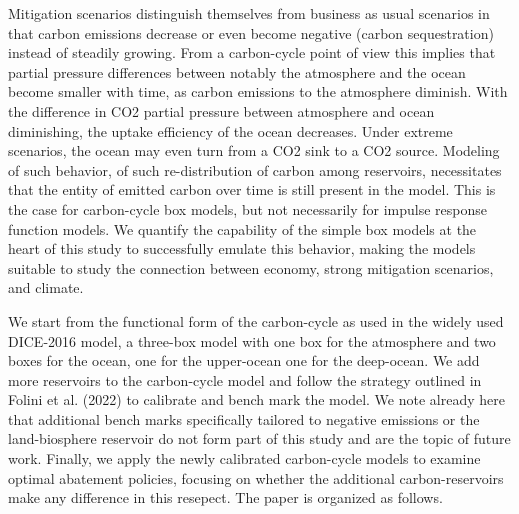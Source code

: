 \documentclass[11pt, a4paper, pdftex, twoside, dvipsnames]{article}
\begin{document}
Mitigation scenarios distinguish themselves from business as usual scenarios in that carbon emissions decrease or even become negative (carbon sequestration) instead of steadily growing. From a carbon-cycle point of view this implies that partial pressure differences between notably the atmosphere and the ocean become smaller with time, as carbon emissions to the atmosphere diminish. With the difference in CO2 partial pressure between atmosphere and ocean diminishing, the uptake efficiency of the ocean decreases. Under extreme scenarios, the ocean may even turn from a CO2 sink to a CO2 source. Modeling of such behavior, of such re-distribution of carbon among reservoirs, necessitates that the entity of emitted carbon over time is still present in the model. This is the case for carbon-cycle box models, but not necessarily for impulse response function models. We quantify the capability of the simple box models at the heart of this study to successfully emulate this behavior, making the models suitable to study the connection between economy, strong mitigation scenarios, and climate. 

We start from the functional form of the carbon-cycle as used in the widely used DICE-2016 model, a three-box model with one box for the atmosphere and two boxes for the ocean, one for the upper-ocean one for the deep-ocean. We add more reservoirs to the carbon-cycle model and follow the strategy outlined in Folini et al. (2022) to calibrate and bench mark the model. We note already here that additional bench marks specifically tailored to negative emissions or the land-biosphere reservoir do not form part of this study and are the topic of future work. Finally, we apply the newly calibrated carbon-cycle models to examine optimal abatement policies, focusing on whether the additional carbon-reservoirs make any difference in this resepect. 
The paper is organized as follows.


\end{document}
